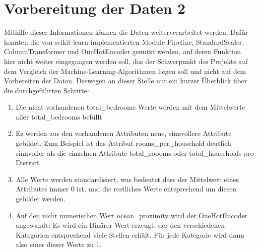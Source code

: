 \section{Vorbereitung der Daten 2}
\label{VorbereitungDerDaten2}
Mithilfe dieser Informationen können die Daten weiterverarbeitet werden. 
Dafür konnten die von scikit-learn implementierten Module Pipeline, StandardScaler, ColumnTransformer und OneHotEncoder genutzt werden, auf deren Funktion hier nicht weiter eingegangen werden soll, das der Schwerpunkt des Projekts auf dem Vergleich der Machine-Learning-Algorithmen liegen soll und nicht auf dem Vorbereiten der Daten. Deswegen an dieser Stelle nur ein kurzer Überblick über die durchgeführten Schritte:
\begin{enumerate}
\item Die nicht vorhandenen total\_bedrooms Werte werden mit dem Mittelwerte aller total\_bedrooms befüllt
\item Es werden aus den vorhandenen Attributen neue, sinnvollere Attribute gebildet. Zum Beispiel ist das Attribut rooms\_per\_household deutlich sinnvoller als die einzelnen Attribute total\_roooms oder total\_households pro District.
\item Alle Werte werden standardisiert, was bedeutet dass der Mittelwert eines Attributes immer 0 ist, und die restliches Werte entsprechend um diesen gebildet werden.
\item Auf den nicht numerischen Wert ocean\_proximity wird der OneHotEncoder angewandt: Es wird ein Binärer Wert erzeugt, der den verschiedenen Kategorien entsprechend viele Stellen erhält. Für jede Kategorie wird dann also einer dieser Werte zu 1.
\end{enumerate}

